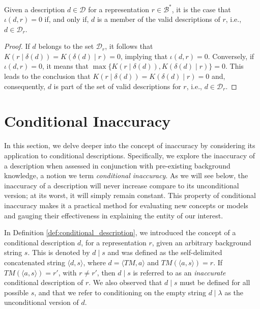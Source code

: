 \begin{proposition}\label{prop:perfect_description}
Given a description $d \in \mathcal{D}$ for a representation $r \in \mathcal{B}^\ast$, it is the case that $\iota(d, r) = 0$ if, and only if, $d$ is a member of the valid descriptions of $r$, i.e., $d \in \mathcal{D}_r$.
\end{proposition}
\begin{proof}
If $d$ belongs to the set $\mathcal{D}_r$, it follows that $K \left( r \mid \delta(d) \right) = K \left( \delta(d) \mid r \right) = 0$, implying that $\iota(d, r) = 0$. Conversely, if $\iota(d, r) = 0$, it means that $\max\{ K \left( r \mid \delta(d) \right), K \left( \delta(d) \mid r \right) \} = 0$. This leads to the conclusion that $K \left( r \mid \delta(d) \right) = K \left( \delta(d) \mid r \right) = 0$ and, consequently, $d$ is part of the set of valid descriptions for $r$, i.e., $d \in \mathcal{D}_r$.
\end{proof}


%
%

\section{Conditional Inaccuracy}

In this section, we delve deeper into the concept of inaccuracy by considering its application to conditional descriptions. Specifically, we explore the inaccuracy of a description when assessed in conjunction with pre-existing background knowledge, a notion we term \emph{conditional inaccuracy}. As we will see below, the inaccuracy of a description will never increase compare to its unconditional version; at its worst, it will simply remain constant. This property of conditional inaccuracy makes it a practical method for evaluating new concepts or models and gauging their effectiveness in explaining the entity of our interest.

In Definition \ref{def:conditional_description}, we introduced the concept of a conditional description $d$, for a representation $r$, given an arbitrary background string $s$. This is denoted by $d \mid s$ and was defined as the self-delimited concatenated string $\langle d, s \rangle$, where $d = \langle TM, a \rangle$ and $TM \left(\langle a, s \rangle \right) = r$. If $TM \left(\langle a, s \rangle \right) = r'$, with $r \neq r'$, then $d \mid s$ is referred to as an \emph{inaccurate} conditional description of $r$. We also observed that $d \mid s$ must be defined for all possible $s$, and that we refer to conditioning on the empty string $d \mid \lambda$ as the unconditional version of $d$.

